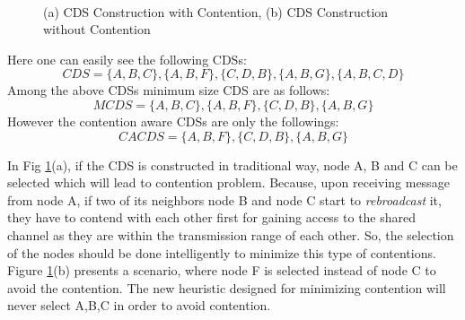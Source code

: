 \begin{figure}[h] 
    \centering
    \label{subfig1}\hfill
    \label{subfig2}\\
  \caption{(a) CDS Construction with Contention, (b) CDS Construction without Contention}
  \label{aa} 
\end{figure}
Here one can easily see the following CDSs: 
 $$CDS = \{A,B,C\}, \{A,B,F\}, \{C,D,B\}, \{A,B,G\}, \{A,B,C,D\}$$
Among the above CDSs minimum size CDS  are as follows: 
$$MCDS = \{A,B,C\}, \{A,B,F\}, \{C,D,B\}, \{A,B,G\}$$
However the contention aware CDSs are only the followings:
$$CACDS = \{A,B,F\}, \{C,D,B\}, \{A,B,G\}$$
 
 In Fig \ref{aa}(a), if the CDS is constructed in traditional way, node A, B and C can be selected which will lead to contention problem. Because, upon receiving message from node A, if two of its neighbors node B and node C start to \emph{rebroadcast} it, they have to contend with each other first for gaining access to the shared channel as they are within the transmission range of each other. So, the selection of the nodes should be done intelligently to minimize this type of contentions. Figure \ref{aa}(b) presents a scenario, where node F is selected instead of node C to avoid the contention. The new heuristic designed for minimizing contention will never select {A,B,C} in order to avoid contention.
